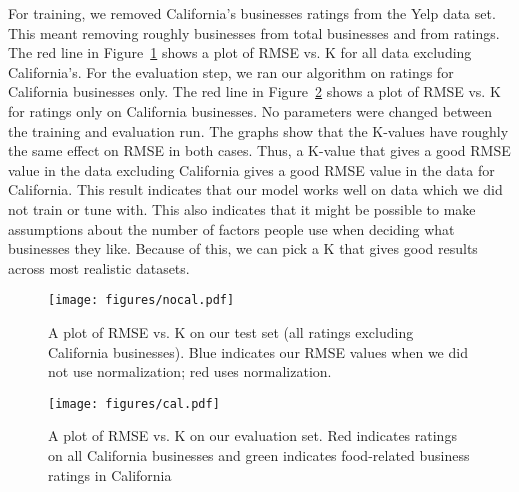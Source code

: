 For training, we removed California's businesses ratings from the Yelp data
set. This meant removing roughly \numBusCA businesses from \numBusTotal total
businesses and \numRatingCA from \numRatingTotal ratings.  The red line in
Figure~\ref{fig:nocal} shows a plot of RMSE vs. K for all data excluding
California's. For the evaluation step, we ran our algorithm on ratings for
California businesses only. The red line in Figure~\ref{fig:cal} shows a plot
of RMSE vs. K for ratings only on California businesses. No parameters were
changed between the training and evaluation run. The graphs show that the
K-values have roughly the same effect on RMSE in both cases. Thus, a K-value
that gives a good RMSE value in the data excluding California gives a good RMSE
value in the data for California. This result indicates that our model works
well on data which we did not train or tune with. This also indicates that it
might be possible to make assumptions about the number of factors people use
when deciding what businesses they like. Because of this, we can pick a K that
gives good results across most realistic datasets.

\begin{figure}[ht!]
	\centering
	\texttt{[image: figures/nocal.pdf]}
  \caption[]{A plot of RMSE vs. K on our test set (all ratings excluding
California businesses). Blue indicates our RMSE values when we did not use
normalization; red uses normalization.}

	\label{fig:nocal}
\end{figure}


\begin{figure}[ht!]
	\centering
	\texttt{[image: figures/cal.pdf]}
  \caption[]{A plot of RMSE vs. K on our evaluation set. Red indicates ratings
on all California businesses and green indicates food-related business ratings
in California}

	\label{fig:cal}
\end{figure}



